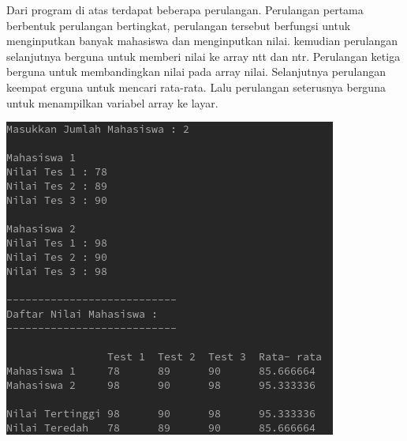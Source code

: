 \documentclass[a4paper,12pt]{article}
\begin{document}
Dari program di atas terdapat beberapa perulangan. Perulangan pertama berbentuk perulangan bertingkat, perulangan tersebut berfungsi untuk menginputkan banyak
mahasiswa dan menginputkan nilai. kemudian perulangan selanjutnya berguna untuk memberi nilai ke array ntt dan ntr. Perulangan ketiga berguna untuk membandingkan 
nilai pada array nilai. Selanjutnya perulangan keempat erguna untuk mencari rata-rata. Lalu perulangan seterusnya berguna untuk menampilkan variabel array ke layar.
\begin{center}
    \includegraphics{9.png}
\end{center}
\end{document}
